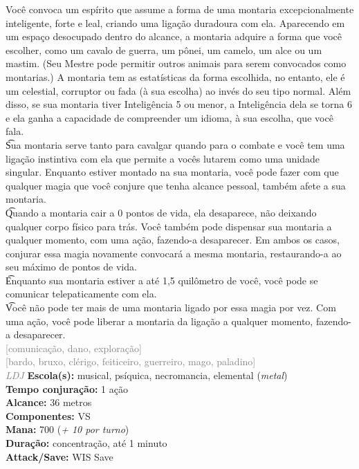 \documentclass{RPG_Adventure}[2021/10/20]
\begin{document}
{\normalsize Você convoca um espírito que assume a forma de uma montaria excepcionalmente inteligente, forte e leal, criando uma ligação duradoura com ela. Aparecendo em um espaço desocupado dentro do alcance, a montaria adquire a forma que você escolher, como um cavalo de guerra, um pônei, um camelo, um alce ou um mastim.  (Seu Mestre pode permitir outros animais para serem convocados como montarias.) A montaria tem as estatísticas da forma escolhida, no entanto, ele é um celestial, corruptor ou fada (à sua escolha) ao invés do seu tipo normal. Além disso, se sua montaria tiver Inteligência 5 ou menor, a Inteligência dela se torna 6 e ela ganha a capacidade de compreender um idioma, à sua escolha, que você fala.\\\t Sua montaria serve tanto para cavalgar quando para o combate e você tem uma ligação instintiva com ela que permite a vocês lutarem como uma unidade singular.  Enquanto estiver montado na sua montaria, você pode fazer com que qualquer magia que você conjure que tenha alcance pessoal, também afete a sua montaria.\\\t Quando a montaria cair a 0 pontos de vida, ela desaparece, não deixando qualquer corpo físico para trás.  Você também pode dispensar sua montaria a qualquer momento, com uma ação, fazendo-a desaparecer. Em ambos os casos, conjurar essa magia novamente convocará a mesma montaria, restaurando-a ao seu máximo de pontos de vida.\\\t Enquanto sua montaria estiver a até 1,5 quilômetro de você, você pode se comunicar telepaticamente com ela.\\\t Você não pode ter mais de uma montaria ligado por essa magia por vez. Com uma ação, você pode liberar a montaria da ligação a qualquer momento, fazendo-a desaparecer.\\}
{\scriptsize \textcolor{gray}{[comunicação, dano, exploração]\\}}
{\scriptsize \textcolor{gray}{[bardo, bruxo, clérigo, feiticeiro, guerreiro, mago, paladino]\\}}
{\tiny \textcolor{gray}{\textit{LDJ}}}
{\small \t \textbf{Escola(s):} musical, psíquica, necromancia, elemental (\textit{metal})\\\t \textbf{Tempo conjuração:} 1 ação\\\t \textbf{Alcance:} 36 metros\\\t \textbf{Componentes:} VS\\\t \textbf{Mana:} 700 (\textit{+ 10 por turno})\\\t \textbf{Duração:} concentração, até 1 minuto\\\t \textbf{Attack/Save:} WIS Save\\}
\end{document}
